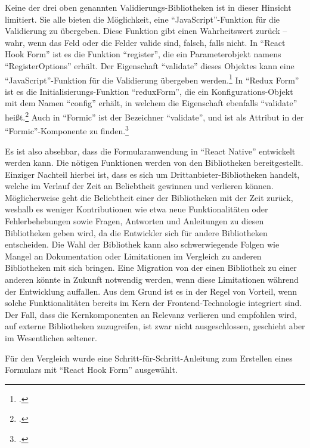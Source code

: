 Keine der drei oben genannten Validierungs-Bibliotheken ist in dieser Hinsicht limitiert.
Sie alle bieten die Möglichkeit, eine \enquote{JavaScript}-Funktion für die Validierung zu übergeben.
Diese Funktion gibt einen Wahrheitswert zurück -- wahr, wenn das Feld oder die Felder valide sind, falsch, falls nicht.
In \enquote{React Hook Form} ist es die Funktion \enquote{register}, die ein Parameterobjekt namens \enquote{RegisterOptions} erhält.
Der Eigenschaft \enquote{validate} dieses Objektes kann eine \enquote{JavaScript}-Funktion für die Validierung übergeben werden.\footcite[Vgl.][]{RegisterReactHookFormAPI}
In \enquote{Redux Form} ist es die Initialisierungs-Funktion \enquote{reduxForm}, die ein Konfigurations-Objekt mit dem Namen \enquote{config} erhält, in welchem die Eigenschaft ebenfalls \enquote{validate} heißt.\footcite[Vgl.][]{ReduxFormReduxFormAPI}
Auch in \enquote{Formic} ist der Bezeichner \enquote{validate}, und ist als Attribut in der \enquote{Formic}-Komponente  zu finden.\footcite[Vgl.][]{FormikComponentFormikDocsAPI}


Es ist also absehbar, dass die Formularanwendung in \enquote{React Native} entwickelt werden kann.
Die nötigen Funktionen werden von den Bibliotheken bereitgestellt.
Einziger Nachteil hierbei ist, dass es sich um Drittanbieter-Bibliotheken handelt, welche im Verlauf der Zeit an Beliebtheit gewinnen und verlieren können.
Möglicherweise geht die Beliebtheit einer der Bibliotheken mit der Zeit zurück, weshalb es weniger Kontributionen wie etwa neue Funktionalitäten oder Fehlerbehebungen 
sowie Fragen, Antworten und Anleitungen zu diesen Bibliotheken geben wird, da die Entwickler sich für andere Bibliotheken entscheiden.
Die Wahl der Bibliothek kann also schwerwiegende Folgen wie Mangel an Dokumentation oder Limitationen im Vergleich zu anderen Bibliotheken mit sich bringen.
Eine Migration von der einen Bibliothek zu einer anderen könnte in Zukunft notwendig werden, wenn diese Limitationen während der Entwicklung auffallen.
Aus dem Grund ist es in der Regel von Vorteil, wenn solche Funktionalitäten bereits im Kern der Frontend-Technologie integriert sind.
Der Fall, dass die Kernkomponenten an Relevanz verlieren und empfohlen wird, auf externe Bibliotheken zuzugreifen, ist zwar nicht ausgeschlossen, geschieht aber im Wesentlichen seltener.

Für den Vergleich wurde eine Schritt-für-Schritt-Anleitung zum Erstellen eines Formulars mit \enquote{React Hook Form} ausgewählt.  


